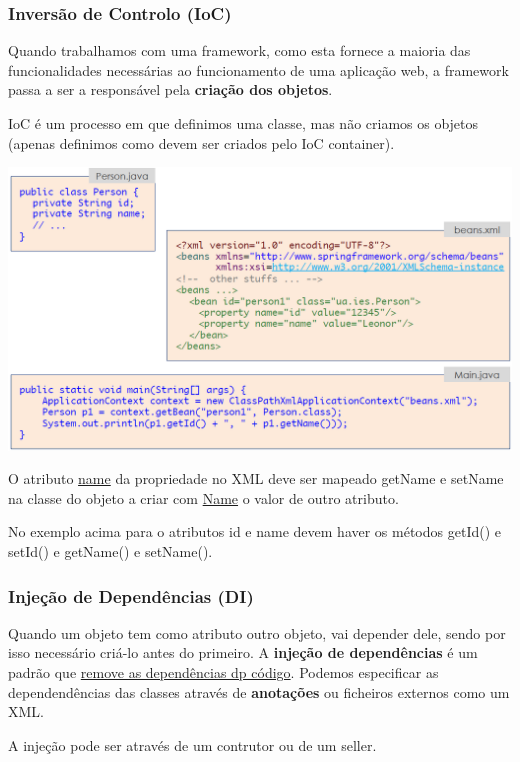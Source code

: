 \documentclass{article}
\begin{document}
\subsubsection{Inversão de Controlo (IoC)}

Quando trabalhamos com uma framework, como esta fornece a maioria das funcionalidades
necessárias ao funcionamento de uma aplicação web, a framework passa a ser a responsável
pela \textbf{criação dos objetos}.

IoC é um processo em que definimos uma classe, mas não criamos
os objetos (apenas definimos como devem ser criados pelo
IoC container).

\begin{center}
  \includegraphics[scale=0.4]{77}
\end{center}

O atributo \uline{name} da propriedade no XML deve ser mapeado getName e setName
na classe do objeto a criar com \uline{Name} o valor de outro atributo.

No exemplo acima para o atributos id e name devem haver os métodos getId() e setId() e getName() e setName().

\subsubsection{Injeção de Dependências (DI)}

Quando um objeto tem como atributo outro objeto, vai depender dele, sendo por isso
necessário criá-lo antes do primeiro. A \textbf{injeção de dependências}
é um padrão que \uline{remove as dependências dp código}.
Podemos especificar as dependendências das classes através de
\textbf{anotações} ou ficheiros externos como um XML.

A injeção pode ser através de um contrutor ou de um seller.
\end{document}
